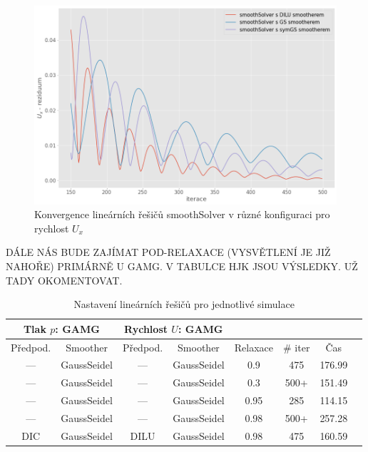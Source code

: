 \documentclass[a4paper,12pt]{report}
\theoremstyle{remark}
\begin{document}
\begin{figure}[H]
	\centering
	\includegraphics[width=1\linewidth]{ux-residuum-smooth.png}
	\caption{Konvergence lineárních řešičů smoothSolver v různé konfiguraci pro rychlost $U_x$}
	\label{fig:ux-residuum-smooth}
\end{figure}
	

DÁLE NÁS BUDE ZAJÍMAT POD-RELAXACE (VYSVĚTLENÍ JE JIŽ NAHOŘE) PRIMÁRNĚ U GAMG. V TABULCE HJK JSOU VÝSLEDKY. UŽ TADY OKOMENTOVAT.

 \begin{table}[H]
	\centering
	\caption{Nastavení lineárních řešičů pro jednotlivé simulace}
	\renewcommand{\arraystretch}{1.9}
	\begin{tabular}{*8c}
		\toprule
		\multicolumn{2}{c}{Tlak $p$: \textbf{GAMG}} & \multicolumn{2}{c}{Rychlost $U$: \textbf{GAMG}}\\		
		\midrule
		Předpod.&Smoother&Předpod.&Smoother&Relaxace& \# iter&Čas\\
		
		\midrule
		
		--- & GaussSeidel &  --- & GaussSeidel & 0.9&475&176.99\\
		--- & GaussSeidel &  --- & GaussSeidel & 0.3&500+&151.49\\
		--- & GaussSeidel &  --- & GaussSeidel & 0.95&285&114.15\\
		--- & GaussSeidel &  --- & GaussSeidel & 0.98&500+&257.28\\		
		DIC & GaussSeidel &  DILU & GaussSeidel & 0.98&475&160.59\\
		\bottomrule
	\end{tabular}
	
	\label{table:solvers_gamg_relax}
	
\end{table}
\end{document}
